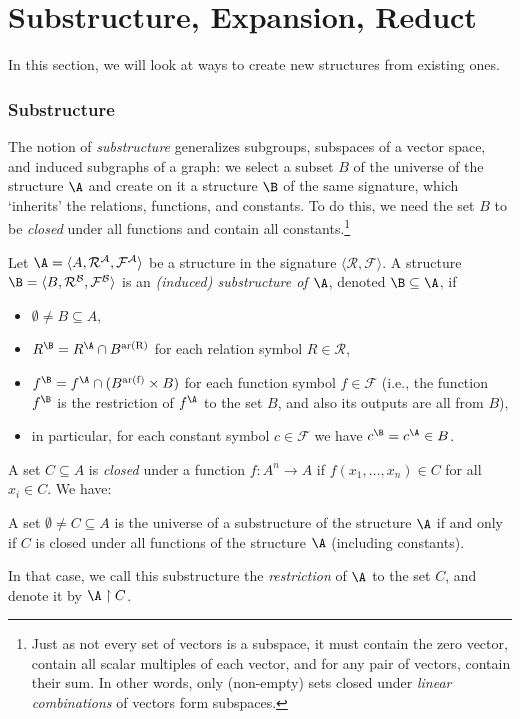\section{Substructure, Expansion, Reduct}

In this section, we will look at ways to create new structures from existing ones.

\subsubsection{Substructure}

The notion of \emph{substructure} generalizes subgroups, subspaces of a vector space, and induced subgraphs of a graph: we select a subset $B$ of the universe of the structure $\A$ and create on it a structure $\B$ of the same signature, which `inherits' the relations, functions, and constants. To do this, we need the set $B$ to be \emph{closed} under all functions and contain all constants.\footnote{Just as not every set of vectors is a subspace, it must contain the zero vector, contain all scalar multiples of each vector, and for any pair of vectors, contain their sum. In other words, only (non-empty) sets closed under \emph{linear combinations} of vectors form subspaces.}

\begin{definition}[Substructure]
Let $\A=\langle A,\mathcal R^\mathcal A,\mathcal F^\mathcal A\rangle$ be a structure in the signature $\langle\mathcal R,\mathcal F\rangle$. A structure $\B=\langle B,\mathcal R^\mathcal B,\mathcal F^\mathcal B\rangle$ is an \emph{(induced) substructure of $\A$}, denoted $\B\subseteq\A$, if
\begin{itemize}
    \item $\emptyset\neq B\subseteq A$,
    \item $R^\B=R^\A\cap B^{\mathrm{ar(R)}}$ for each relation symbol $R\in \mathcal R$,
    \item $f^\B=f^\A\cap (B^{\mathrm{ar(f)}}\times B)$ for each function symbol $f\in \mathcal F$ (i.e., the function $f^\B$ is the restriction of $f^\A$ to the set $B$, and also its outputs are all from $B$),
    \item in particular, for each constant symbol $c\in\mathcal F$ we have $c^\B=c^\A\in B$.
\end{itemize}
\end{definition}
A set $C\subseteq A$ is \emph{closed} under a function $f:A^n\to A$ if $f(x_1,\dots,x_n)\in C$ for all $x_i\in C$. We have:
\begin{observation}
    A set $\emptyset\neq C\subseteq A$ is the universe of a substructure of the structure $\A$ if and only if $C$ is closed under all functions of the structure $\A$ (including constants).
\end{observation}
In that case, we call this substructure the \emph{restriction} of $\A$ to the set $C$, and denote it by $\A\restriction C$.

